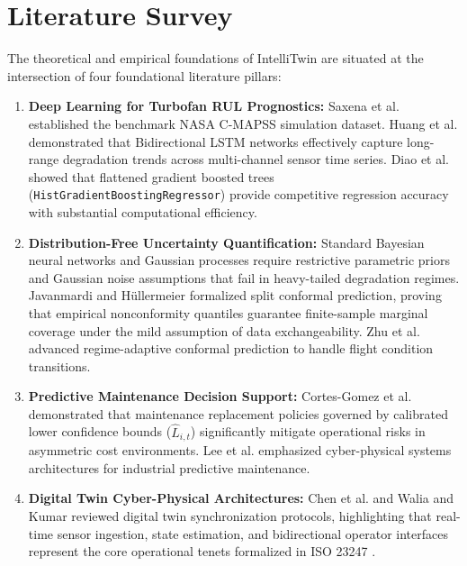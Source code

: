\documentclass[12pt,a4paper]{article}
\begin{document}
\section{Literature Survey}
The theoretical and empirical foundations of IntelliTwin are situated at the intersection of four foundational literature pillars:
\begin{enumerate}[label=\textbf{\arabic*.}]
    \item \textbf{Deep Learning for Turbofan RUL Prognostics:} Saxena et al. \cite{saxena2008damage} established the benchmark NASA C-MAPSS simulation dataset. Huang et al. \cite{huang2021bidirectional} demonstrated that Bidirectional LSTM networks effectively capture long-range degradation trends across multi-channel sensor time series. Diao et al. \cite{diao2026ensemble} showed that flattened gradient boosted trees (\texttt{HistGradientBoostingRegressor}) provide competitive regression accuracy with substantial computational efficiency.
    \item \textbf{Distribution-Free Uncertainty Quantification:} Standard Bayesian neural networks and Gaussian processes require restrictive parametric priors and Gaussian noise assumptions that fail in heavy-tailed degradation regimes. Javanmardi and H\"ullermeier \cite{javanmardi2023conformal} formalized split conformal prediction, proving that empirical nonconformity quantiles guarantee finite-sample marginal coverage under the mild assumption of data exchangeability. Zhu et al. \cite{zhu2025regime} advanced regime-adaptive conformal prediction to handle flight condition transitions.
    \item \textbf{Predictive Maintenance Decision Support:} Cortes-Gomez et al. \cite{cortesgomez2025predictive} demonstrated that maintenance replacement policies governed by calibrated lower confidence bounds ($\hat{L}_{i,t}$) significantly mitigate operational risks in asymmetric cost environments. Lee et al. \cite{lee2023industrial} emphasized cyber-physical systems architectures for industrial predictive maintenance.
    \item \textbf{Digital Twin Cyber-Physical Architectures:} Chen et al. \cite{chen2022digital} and Walia and Kumar \cite{walia2026digital} reviewed digital twin synchronization protocols, highlighting that real-time sensor ingestion, state estimation, and bidirectional operator interfaces represent the core operational tenets formalized in ISO 23247 \cite{iso23247_1}.
\end{enumerate}

\end{document}
